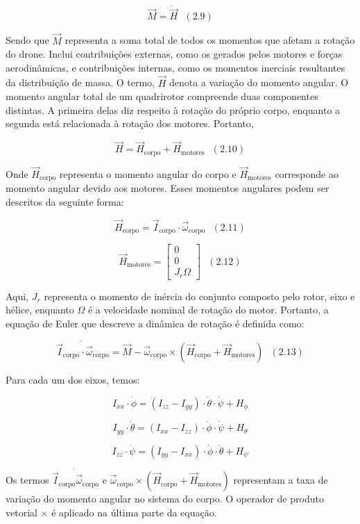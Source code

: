 \[ \vec{M} = \dot{\vec{H}} \ \ \ (2.9) \]


Sendo que \(\vec{M}\) representa a soma total de todos os momentos que afetam a rotação do drone. Inclui contribuições externas, como os gerados pelos motores e forças aerodinâmicas, e contribuições internas, como os momentos inerciais resultantes da distribuição de massa.
O termo, \(\vec{H}\) denota a variação do momento angular. O momento angular total de um quadrirotor compreende duas componentes distintas. A primeira delas diz respeito à rotação do próprio corpo, enquanto a segunda está relacionada à rotação dos motores. Portanto,

\[ \vec{H} = \vec{H}_{\text{corpo}} + \vec{H}_{\text{motores}} \ \ \ (2.10) \]

Onde \(\vec{H}_{\text{corpo}}\) representa o momento angular do corpo e \(\vec{H}_{\text{motores}}\) corresponde ao momento angular devido aos motores. Esses momentos angulares podem ser descritos da seguinte forma:

\[ \vec{H}_{\text{corpo}} = \vec{I}_{\text{corpo}} \cdot \vec{\omega}_{\text{corpo}} \ \ \ (2.11) \]

\[ \vec{H}_{\text{motores}} = \begin{bmatrix} 0 \\ 0 \\ J_r \Omega \end{bmatrix} \ \ \ (2.12) \]

Aqui, \(J_r\) representa o momento de inércia do conjunto composto pelo rotor, eixo e hélice, enquanto \(\Omega\) é a velocidade nominal de rotação do motor. Portanto, a equação de Euler que descreve a dinâmica de rotação é definida como:

\[ \dot{\vec{I}_{\text{corpo}} \cdot \vec{\omega}_{\text{corpo}}} = \vec{M} - \vec{\omega}_{\text{corpo}} \times (\vec{H}_{\text{corpo}} + \vec{H}_{\text{motores}}) \ \ \ (2.13) \]

Para cada um dos eixos, temos:

\[
	I_{xx} \cdot \dot{\phi} = (I_{zz} - I_{yy}) \cdot \dot{\theta} \cdot \dot{\psi} + H_{\phi}
\]

\[
	I_{yy} \cdot \dot{\theta} = (I_{xx} - I_{zz}) \cdot \dot{\phi} \cdot \dot{\psi} + H_{\theta}
\]

\[
	I_{zz} \cdot \dot{\psi} = (I_{yy} - I_{xx}) \cdot \dot{\phi} \cdot \dot{\theta} + H_{\psi}
\]

Os termos \(\dot{\vec{I}_{\text{corpo}}  \vec{\omega}_{\text{corpo}}}\)    e    \(\vec{\omega}_{\text{corpo}} \times (\vec{H}_{\text{corpo}} + \vec{H}_{\text{motores}})\) representam a taxa de variação do momento angular no sistema do corpo. O operador de produto vetorial \(\times\) é aplicado na última parte da equação.

